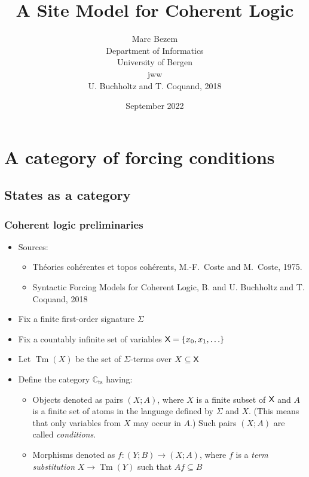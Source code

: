 \documentclass[handout,11pt]{beamer}
\title{A Site Model for Coherent Logic}
\author{Marc Bezem\\
Department of Informatics\\
University of Bergen\\
jww\\
U. Buchholtz and T. Coquand, 2018
}
\date{September 2022}
\newcommand{\set}[1]{\{#1\}}
\newcommand{\XX}{\mbox{\sf X}}
\newcommand*{\subts}{_{\mathrm{ts}}}
\newcommand{\Cts}{\mathbb{C}\subts}
\DeclareMathOperator{\Tm}{Tm}
\begin{document}
\frame{\titlepage}

\section[Outline]{}
\frame{\tableofcontents}


\section{A category of forcing conditions}

\subsection{States as a category}

\begin{frame}
\frametitle{Coherent logic preliminaries}
 \begin{itemize}[<+->]   %
  \item Sources: 
   \begin{itemize}[<+->]   %
    \item Th{\'e}ories coh{\'e}rentes et topos coh{\'e}rents,
    M.-F.~Coste and M.~Coste, 1975.
    \item Syntactic Forcing Models for Coherent Logic, 
    B. and U. Buchholtz and T. Coquand, 2018
    \end{itemize}
   \item Fix a finite first-order signature $\Sigma$
   \item Fix a countably infinite set of variables $\XX=\set{x_0,x_1,\ldots}$
   \item Let $\Tm(X)$ be the set of $\Sigma$-terms over $X \subseteq \XX$    
   \item Define the category $\Cts$ having:
    \begin{itemize}[<+->]   %
    \item Objects denoted as pairs $(X;A)$,
    where $X$ is a finite subset of $\XX$ and $A$ is a finite set
    of atoms in the language defined by $\Sigma$ and $X$.
    (This means that only variables from $X$ may occur in $A$.)
    Such pairs $(X;A)$ are called \emph{conditions}.
    \item Morphisms denoted as $f : (Y;B) \to (X;A)$,
where $f$ is a \emph{term substitution} $X \to \Tm(Y)$ such that $Af \subseteq B$
    \end{itemize}
 \end{itemize}
\end{frame}
\end{document}
